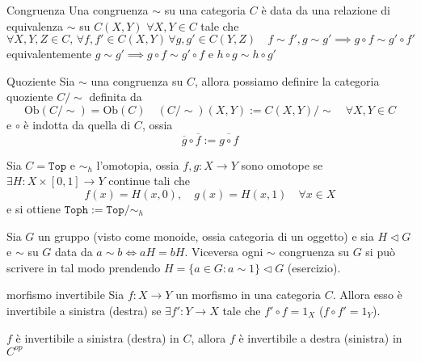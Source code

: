 \begin{definition}{Congruenza}
    Una congruenza \(\sim \) su una categoria \(C\) è data da una relazione di
    equivalenza \(\sim \) su \(C{(X, Y)}\) \(\forall X, Y \in C\) tale che
    \[
      \forall X, Y, Z \in C, \, \forall f, f' \in C{(X, Y)} \, \forall g,
      g' \in C{(Y, Z)} \quad f \sim f', g \sim g' \implies g \circ f \sim g'
      \circ f'
    \]
    equivalentemente \(g \sim g' \implies g \circ f \sim g' \circ f\) e \(h \circ g \sim h \circ g'\) 
\end{definition}

\begin{definition}{Quoziente}
    Sia \(\sim \) una congruenza su \(C\), allora possiamo definire la categoria
    quoziente \(C / \sim \) definita da
    \[
      \mathrm{Ob}{(C / \sim )} = \mathrm{Ob}{(C)} \quad {(C / \sim )}{(X, Y)} :=
      C{(X, Y)} / \sim \quad \forall X, Y \in C
    \]
    e \(\circ\) è indotta da quella di \(C\), ossia
    \[
      \overline{g} \circ \overline{f} := \overline{g \circ f}
    \]
\end{definition}

\begin{example}[Omotopia]
    Sia \(C = \mathtt{Top}\) e \(\sim_h \) l'omotopia, ossia \(f, g : X \to Y\)
    sono omotope se \(\exists  H : X \times [0, 1] \to Y\) continue tali che 
    \[
      f{(x)} = H{(x, 0)}, \quad g{(x)} = H{(x, 1)} \quad \forall x \in X
    \]
    e si ottiene \(\mathtt{Toph} := \mathtt{Top} / \sim_h \) 
\end{example}

\begin{example}
    Sia \(G\) un gruppo (visto come monoide, ossia categoria di un oggetto) e
    sia \(H \vartriangleleft G\) e \(\sim \) su \(G\) data da \(a \sim b \iff aH
    = bH\). Viceversa ogni \(\sim \) congruenza su \(G\) si può scrivere in tal
    modo prendendo \(H = \{a \in G : a \sim 1\} \vartriangleleft G \) (esercizio).
\end{example}

\begin{definition}{morfismo invertibile}
    Sia \(f : X\to Y\) un morfismo in una categoria \(C\). Allora esso è
    invertibile a sinistra (destra) se \(\exists  f' : Y \to X\) tale che
    \(f' \circ f = 1_X\) (\(f \circ f' = 1_Y\)).
\end{definition}
\begin{remark}{}
    \(f\) è invertibile a sinistra (destra) in \(C\), allora \(f\) è invertibile
    a destra (sinistra) in \(C^{op}\) 
\end{remark}


